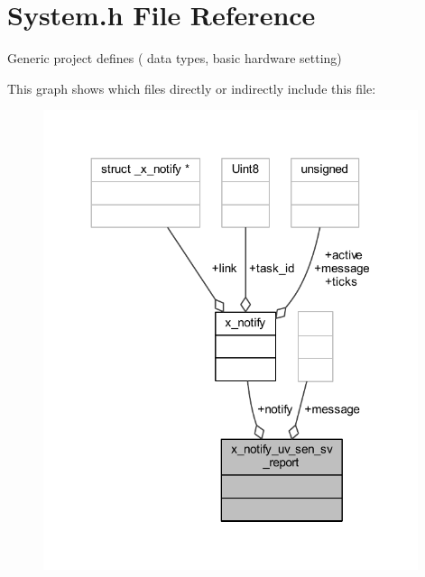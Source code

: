 \hypertarget{a00072}{\section{System.\+h File Reference}
\label{a00072}
}


Generic project defines ( data types, basic hardware setting)  


This graph shows which files directly or indirectly include this file\+:\nopagebreak
\begin{figure}[H]
\begin{center}
\leavevmode
\includegraphics[width=311pt]{d1/da7/a01709}
\end{center}
\end{figure}
